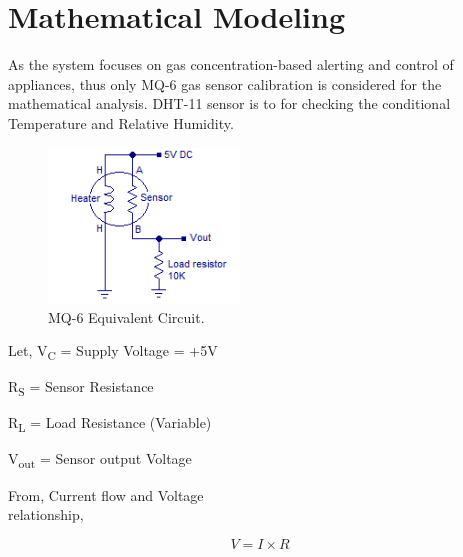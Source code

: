 \chapter{\textbf{Mathematical Modeling}}
As the system focuses on gas concentration-based alerting and control of appliances, thus only MQ-6 gas sensor calibration is considered for the mathematical analysis. DHT-11 sensor is to for checking the conditional Temperature and Relative Humidity.

\begin{figure}[h]
  \centering
  \includegraphics[width=2in]{14}
  \caption{MQ-6 Equivalent Circuit.}\label{fig14}
\end{figure}

\begin{justify}
Let, V\textsubscript{C} = Supply Voltage = +5V
\end{justify}\par

\begin{justify}
R\textsubscript{S} = Sensor Resistance
\end{justify}\par

\begin{justify}
R\textsubscript{L} = Load Resistance (Variable)
\end{justify}\par

\begin{justify}
V\textsubscript{out} = Sensor output Voltage
\end{justify}\par

\begin{justify}
From, Current flow and Voltage relationship,\ \ \ \ \ \ \ \ \ \ \ \ \ \ \ \ \ \ \ \ \ \ \ \ \ \ \ \ \ \ \ \ \ \
\end{justify}\par

\begin{equation}\label{5.1}
  V=I \times R
\end{equation}

